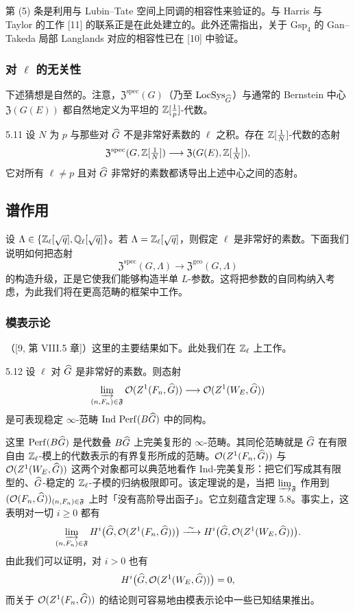 第 (5) 条是利用与 Lubin--Tate 空间上同调的相容性来验证的。与 Harris 与 Taylor 的工作 [11] 的联系正是在此处建立的。此外还需指出，关于 $\mathrm{Gsp}_4$ 的 Gan--Takeda 局部 Langlands 对应的相容性已在 [10] 中验证。

\subsubsection{对 $\ell$ 的无关性}
下述猜想是自然的。注意，$\mathfrak Z^{\mathrm{spec}}(G)$（乃至 $\operatorname{LocSys}_{\widehat{G}}$）与通常的 Bernstein 中心 $\mathfrak Z(G(E))$ 都自然地定义为平坦的 $\mathbb{Z}[\frac1p]$-代数。

\begin{conj}{5.11}\label{conj:a3-5-11}
设 $N$ 为 $p$ 与那些对 $\widehat{G}$ 不是非常好素数的 $\ell$ 之积。存在 $\mathbb{Z}[\frac1N]$-代数的态射
\[
\mathfrak Z^{\mathrm{spec}}(G,\mathbb{Z}[\tfrac1N])\longrightarrow \mathfrak Z(G(E),\mathbb{Z}[\tfrac1N]),
\]
它对所有 $\ell\neq p$ 且对 $\widehat{G}$ 非常好的素数都诱导出上述中心之间的态射。
\end{conj}

\subsection{谱作用}
设 $\Lambda\in\{\mathbb{Z}_\ell[\sqrt q],\mathbb{Q}_\ell[\sqrt q]\}$。若 $\Lambda=\mathbb{Z}_\ell[\sqrt q]$，则假定 $\ell$ 是非常好的素数。下面我们说明如何把态射
\[
\mathfrak Z^{\mathrm{spec}}(G,\Lambda)\longrightarrow\mathfrak Z^{\mathrm{geo}}(G,\Lambda)
\]
的构造升级，正是它使我们能够构造半单 $L$-参数。这将把参数的自同构纳入考虑，为此我们将在更高范畴的框架中工作。

\subsubsection{模表示论}
（[9, 第 VIII.5 章]）这里的主要结果如下。此处我们在 $\mathbb{Z}_\ell$ 上工作。

\begin{thm}{5.12}\label{thm:a3-5-12}
设 $\ell$ 对 $\widehat{G}$ 是非常好的素数。则态射
\[
\varinjlim_{(n,F_n)\in\mathfrak{F}}\mathcal{O}(Z^1(F_n,\widehat{G}))\longrightarrow\mathcal{O}(Z^1(W_E,\widehat{G}))
\]
是可表现稳定 $\infty$-范畴 $\mathrm{Ind}\,\operatorname{Perf}(B\widehat{G})$ 中的同构。
\end{thm}

这里 $\operatorname{Perf}(B\widehat{G})$ 是代数叠 $B\widehat{G}$ 上完美复形的 $\infty$-范畴。其同伦范畴就是 $\widehat{G}$ 在有限自由 $\mathbb{Z}_\ell$-模上的代数表示的有界复形所成的范畴。$\mathcal{O}(Z^1(F_n,\widehat{G}))$ 与 $\mathcal{O}(Z^1(W_E,\widehat{G}))$ 这两个对象都可以典范地看作 Ind-完美复形：把它们写成其有限型的、$\widehat{G}$-稳定的 $\mathbb{Z}_\ell$-子模的归纳极限即可。该定理说的是，当把 $\varinjlim_{\mathfrak{F}}$ 作用到 $(\mathcal{O}(F_n,\widehat{G}))_{(n,F_n)\in\mathfrak{F}}$ 上时「没有高阶导出函子」。它立刻蕴含定理 5.8。事实上，这表明对一切 $i\ge 0$ 都有
\[
\varinjlim_{(n,F_n)\in\mathfrak{F}}H^i\bigl(\hatG,\mathcal{O}(Z^1(F_n,\hatG))\bigr)\xrightarrow{\ \sim\ }H^i\bigl(\hatG,\mathcal{O}(Z^1(W_E,\hatG))\bigr).
\]
由此我们可以证明，对 $i>0$ 也有
\[
H^i\bigl(\widehat{G},\mathcal{O}(Z^1(W_E,\widehat{G}))\bigr)=0,
\]
而关于 $\mathcal{O}(Z^1(F_n,\widehat{G}))$ 的结论则可容易地由模表示论中一些已知结果推出。


